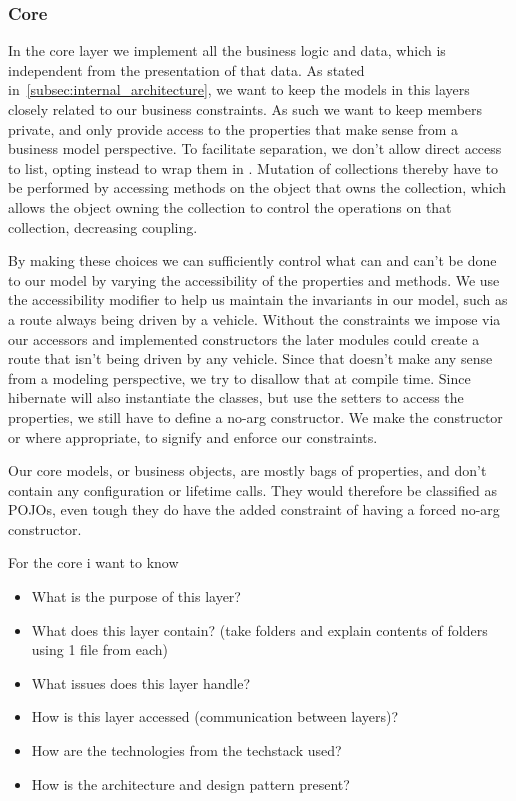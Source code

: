 \subsubsection{Core}
In the core layer we implement all the business logic and data, which is
independent from the presentation of that data. As stated in~\ref{subsec:internal_architecture},
we want to keep the models in this layers closely related to our business
constraints. As such we want to keep members private, and only provide access to
the properties that make sense from a business model perspective. To facilitate
separation, we don't allow direct access to list, opting instead to wrap them in
. Mutation of collections thereby have to be performed
by accessing methods on the object that owns the collection, which allows the
object owning the collection to control the operations on that collection,
decreasing coupling.

By making these choices we can sufficiently control what can and can't be done
to our model by varying the accessibility of the properties and methods. We use
the accessibility modifier to help us maintain the invariants in our model, such
as a route always being driven by a vehicle. Without the constraints we impose
via our accessors and implemented constructors the later modules could create
a route that isn't being driven by any vehicle. Since that doesn't make any
sense from a modeling perspective, we try to disallow that at compile time.
Since hibernate will also instantiate the classes, but use the setters to access
the properties, we still have to define a no-arg constructor. We make the
constructor  or  where appropriate, to
signify and enforce our constraints.

Our core models, or business objects, are mostly bags of properties, and don't
contain any configuration or lifetime calls. They would therefore be classified
as \acp{POJO}, even tough they do have the added constraint of having a forced
no-arg constructor.


For the core i want to know
\begin{itemize}
    \item What is the purpose of this layer?
    \item What does this layer contain? (take folders and explain contents of folders using 1 file from each)
    \item What issues does this layer handle?
    \item How is this layer accessed (communication between layers)?
    \item How are the technologies from the techstack used?
    \item How is the architecture and design pattern present?
\end{itemize}
